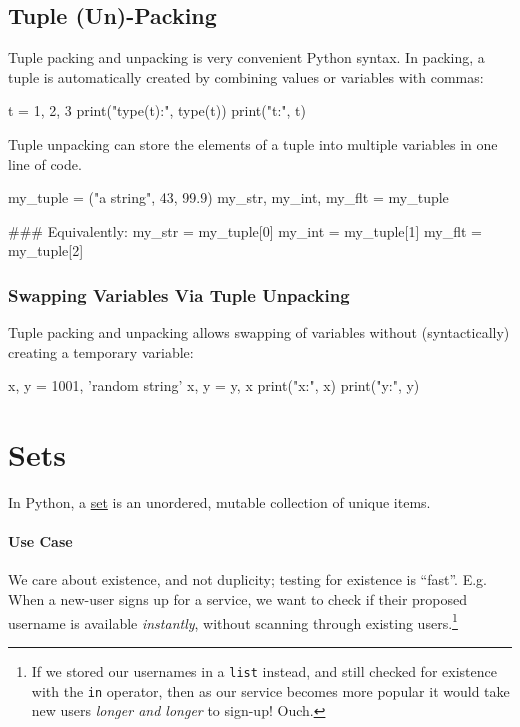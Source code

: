 \documentclass[12pt,letterpaper,twoside]{article}
\begin{document}
\subsection{Tuple (Un)-Packing}

Tuple packing and unpacking is very convenient Python syntax. In
packing, a tuple is automatically created by combining values or
variables with commas:

\begin{python}
t = 1, 2, 3
print("type(t):", type(t))
print("t:", t)
\end{python}

Tuple unpacking can store the elements of a tuple into multiple
variables in one line of code.

\begin{python}
my_tuple = ("a string", 43, 99.9)
my_str, my_int, my_flt = my_tuple

### Equivalently:
my_str = my_tuple[0]
my_int = my_tuple[1]
my_flt = my_tuple[2]
\end{python}

\subsubsection{Swapping Variables Via Tuple Unpacking}

Tuple packing and unpacking allows swapping of variables without (syntactically)
creating a temporary variable:

\begin{python}
x, y = 1001, 'random string'
x, y = y, x
print("x:", x)
print("y:", y)
\end{python}

\vspace{-4ex}
\section{Sets}
\vspace{-2ex}
In Python, a \href{https://docs.python.org/3/tutorial/datastructures.html#sets}{set} is an unordered, 
mutable collection of unique items. 

\vspace{-3ex}
\paragraph{Use Case} We care about existence, and not duplicity; testing for existence is ``fast''.
E.g. When a new-user signs up for a service, we want to check if their proposed username is available 
\emph{instantly}, without scanning through existing users.\footnote{If we stored our usernames in a \texttt{list} instead,
and still checked for existence with the \texttt{in} operator, then as our service becomes more popular it would
take new users \emph{longer and longer} to sign-up! Ouch.}
\end{document}
